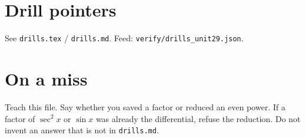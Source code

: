\section{Drill pointers}
See \texttt{drills.tex} / \texttt{drills.md}. Feed: \texttt{verify/drills\_unit29.json}.

\section*{On a miss}
Teach this file. Say whether you saved a factor or reduced an even power. If a factor of $\sec^2 x$ or $\sin x$ was already the differential, refuse the reduction. Do not invent an answer that is not in \texttt{drills.md}.

